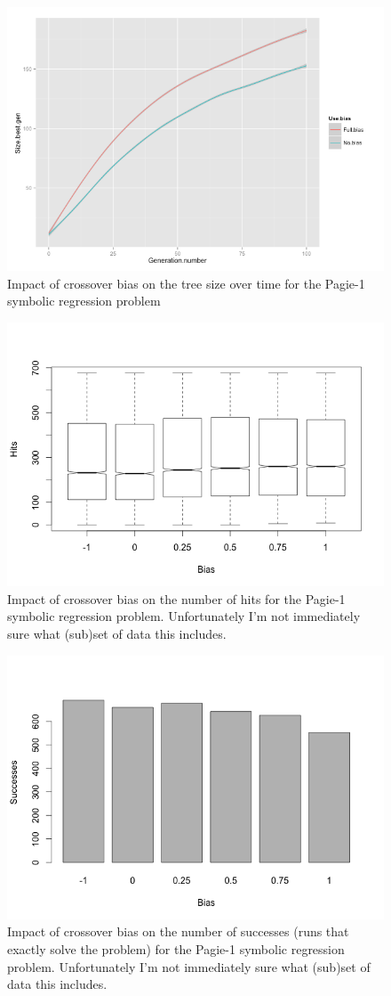 \documentclass{sig-alternate}
\begin{document}
\begin{figure}
\centering
\includegraphics[width=0.45 \textwidth]{Plots/Pagie-1_size_vs_time.png}
\caption{Impact of crossover bias on the tree size over time for the Pagie-1 symbolic regression problem}
\label{fig:Pagie1SizeOverTime}
\end{figure}

\begin{figure}
\centering
\includegraphics[width=0.45 \textwidth]{Plots/Pagie-1_Hits_vs_Bias.png}
\caption{Impact of crossover bias on the number of hits for the Pagie-1 symbolic regression problem. 
Unfortunately I'm not immediately sure what (sub)set of data this includes.}
\label{fig:Pagie1Hits}
\end{figure}

\begin{figure}
\centering
\includegraphics[width=0.45 \textwidth]{Plots/Pagie-1_Successes_vs_Bias.png}
\caption{Impact of crossover bias on the number of successes (runs that exactly solve the problem) for the 
Pagie-1 symbolic regression problem. Unfortunately I'm not immediately sure what (sub)set of data this 
includes.}
\label{fig:Pagie1Successes}
\end{figure}
\end{document}
